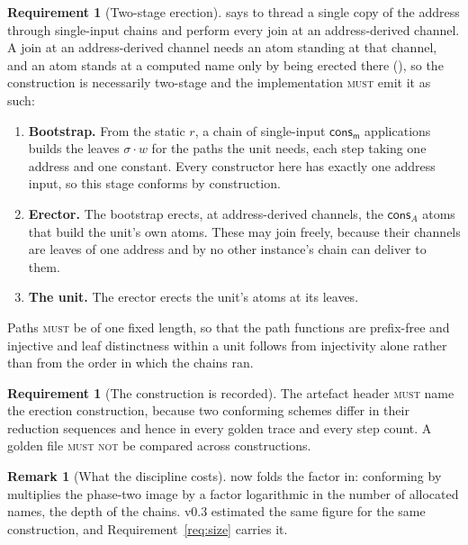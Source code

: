 \documentclass[11pt,a4paper]{article}
\newcommand{\MUST}{\textsc{must}}
\newcommand{\MUSTNOT}{\textsc{must not}}
\newcommand{\mm}{\mathsf{m}}
\newcommand{\cons}{\mathsf{cons}}
\theoremstyle{definition}
\newtheorem{requirement}[definition]{Requirement}
\newtheorem{remark}[definition]{Remark}
\theoremstyle{plain}
\begin{document}
\begin{requirement}[Two-stage erection]\label{req:twostage}
\cite[Rem.~6.12]{draft3} says to thread a single copy of the address through
single-input chains and perform every join at an address-derived channel. A
join at an address-derived channel needs an atom standing at that channel, and
an atom stands at a computed name only by being erected there
(\cite[Rem.~3.11]{draft3}), so the construction is necessarily two-stage and
the implementation \MUST{} emit it as such:
\begin{enumerate}[leftmargin=1.8em,label=(\roman*)]
\item \textbf{Bootstrap.} From the static $r$, a chain of single-input
$\cons_{\mm}$ applications builds the leaves $\sigma\!\cdot\!w$ for the paths
the unit needs, each step taking one address and one constant. Every
constructor here has exactly one address input, so this stage conforms by
construction.
\item \textbf{Erector.} The bootstrap erects, at address-derived channels, the
$\cons_{A}$ atoms that build the unit's own atoms. These may join freely,
because their channels are leaves of one address and by
\cite[Lem.~6.7]{draft3} no other instance's chain can deliver to them.
\item \textbf{The unit.} The erector erects the unit's atoms at its leaves.
\end{enumerate}
Paths \MUST{} be of one fixed length, so that the path functions are
prefix-free and injective and leaf distinctness within a unit follows from
injectivity alone rather than from the order in which the chains ran.
\end{requirement}

\begin{requirement}[The construction is recorded]\label{req:construction}
The artefact header \MUST{} name the erection construction, because two
conforming schemes differ in their reduction sequences and hence in every
golden trace and every step count. A golden file \MUSTNOT{} be compared across
constructions.
\end{requirement}

\begin{remark}[What the discipline costs]
\cite[Prop.~8.1]{draft3} now folds the factor in: conforming by
\cite[Rem.~6.12]{draft3} multiplies the phase-two image by a factor
logarithmic in the number of allocated names, the depth of the chains. v0.3
estimated the same figure for the same construction, and
Requirement~\ref{req:size} carries it.
\end{remark}
\end{document}
